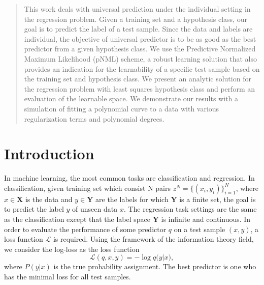 \documentclass[conference,letterpaper]{IEEEtran}
\begin{document}
\begin{abstract}
This work deals with universal prediction under the individual setting in the regression problem. 
Given a training set and a hypothesis class, our goal is to predict the label of a test sample. 
Since the data and labels are individual, the objective of universal predictor is to be as good as the best predictor from a given hypothesis class. 
We use the Predictive Normalized Maximum Likelihood (pNML) scheme, a robust learning solution that also provides an indication for the learnability of a specific test sample based on the training set and hypothesis class. 
We present an analytic solution for the regression problem with least squares hypothesis class and perform an evaluation of the learnable space. 
We demonstrate our results with a simulation of fitting a polynomial curve to a data with various regularization terms and polynomial degrees.
\end{abstract}


\section{Introduction} \label{Introduction}
In machine learning, the most common tasks are classification and regression. In classification, given training set which consist N pairs $z^N=\{(x_i, y_i)\}_{i=1}^{N}$, where $x \in \mathbf{X}$ is the data and $y \in \mathbf{Y}$ are the labels for which $\mathbf{Y}$ is a finite set, the goal is to predict the label $y$ of unseen data $x$. 
The regression task settings are the same as the classification except that the label space $\mathbf{Y}$ is infinite and continuous.
In order to evaluate the performance of some predictor $q$ on a test sample $(x, y)$, a loss function  $\mathcal{L}$ is required. Using the framework of the information theory field, we consider the log-loss as the loss function
\begin{equation}
\mathcal{L}(q,x,y) = -\log {q(y|x}),
\end{equation}
where $P(y|x)$ is the true probability assignment.
The best predictor is one who has the minimal loss for all test samples.
\end{document}
